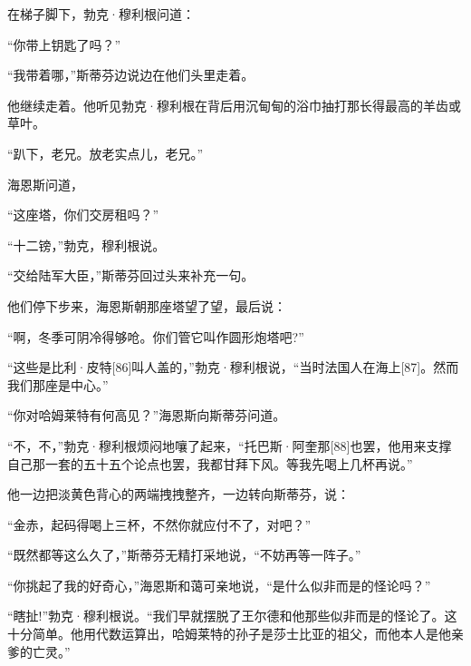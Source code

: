 \documentclass{article}
\begin{document}
在梯子脚下，勃克·穆利根问道：



“你带上钥匙了吗？”



“我带着哪，”斯蒂芬边说边在他们头里走着。



他继续走着。他听见勃克·穆利根在背后用沉甸甸的浴巾抽打那长得最高的羊齿或草叶。



“趴下，老兄。放老实点儿，老兄。”



海恩斯问道，



“这座塔，你们交房租吗？”



“十二镑，”勃克，穆利根说。



“交给陆军大臣，”斯蒂芬回过头来补充一句。



他们停下步来，海恩斯朝那座塔望了望，最后说：



“啊，冬季可阴冷得够呛。你们管它叫作圆形炮塔吧?”



“这些是比利·皮特[86]叫人盖的，”勃克·穆利根说，“当时法国人在海上[87]。然而我们那座是中心。”



“你对哈姆莱特有何高见？”海恩斯向斯蒂芬问道。



“不，不，”勃克·穆利根烦闷地嚷了起来，“托巴斯·阿奎那[88]也罢，他用来支撑自己那一套的五十五个论点也罢，我都甘拜下风。等我先喝上几杯再说。”



他一边把淡黄色背心的两端拽拽整齐，一边转向斯蒂芬，说：



“金赤，起码得喝上三杯，不然你就应付不了，对吧？”



“既然都等这么久了，”斯蒂芬无精打采地说，“不妨再等一阵子。”



“你挑起了我的好奇心，”海恩斯和蔼可亲地说，“是什么似非而是的怪论吗？”



“瞎扯!”勃克·穆利根说。“我们早就摆脱了王尔德和他那些似非而是的怪论了。这十分简单。他用代数运算出，哈姆莱特的孙子是莎士比亚的祖父，而他本人是他亲爹的亡灵。”
\end{document}
